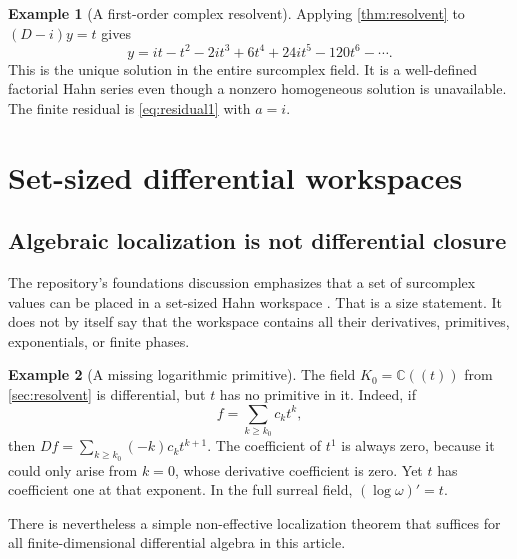 \documentclass[11pt,letterpaper]{article}
\numberwithin{equation}{section}
\theoremstyle{definition}
\newtheorem{example}[example]{Example}
\theoremstyle{remark}
\newcommand{\C}{\mathbb C}
\begin{document}
\begin{example}[A first-order complex resolvent]
Applying \cref{thm:resolvent} to $(D-i)y=t$ gives
\[
 y=it-t^2-2it^3+6t^4+24it^5-120t^6-\cdots.
\]
This is the unique solution in the entire surcomplex field. It is a well-defined factorial Hahn series even though a nonzero homogeneous solution is unavailable. The finite residual is \eqref{eq:residual1} with $a=i$.
\end{example}

\section{Set-sized differential workspaces}\label{sec:localization}

\subsection{Algebraic localization is not differential closure}
The repository's foundations discussion emphasizes that a set of surcomplex values can be placed in a set-sized Hahn workspace \cite{RepoMap}. That is a size statement. It does not by itself say that the workspace contains all their derivatives, primitives, exponentials, or finite phases.

\begin{example}[A missing logarithmic primitive]\label{ex:logmissing}
The field $K_0=\C((t))$ from \cref{sec:resolvent} is differential, but $t$ has no primitive in it. Indeed, if
\[
 f=\sum_{k\geq k_0}c_kt^k,
\]
then $Df=\sum_{k\geq k_0}(-k)c_kt^{k+1}$. The coefficient of $t^1$ is always zero, because it could only arise from $k=0$, whose derivative coefficient is zero. Yet $t$ has coefficient one at that exponent. In the full surreal field, $(\log\omega)'=t$.
\end{example}

There is nevertheless a simple non-effective localization theorem that suffices for all finite-dimensional differential algebra in this article.
\end{document}
